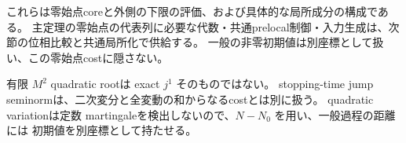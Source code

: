 これらは零始点coreと外側の下限の評価、および具体的な局所成分の構成である。
主定理の零始点の代表列に必要な代数・共通prelocal制御・入力生成は、次節の位相比較と共通局所化で供給する。
一般の非零初期値は別座標として扱い、この零始点costに隠さない。

有限 $M^2$ quadratic rootは exact $j^1$ そのものではない。
stopping-time jump seminormは、二次変分と全変動の和からなるcostとは別に扱う。
quadratic variationは定数 martingaleを検出しないので、$N-N_0$ を用い、一般過程の距離には
初期値を別座標として持たせる。
